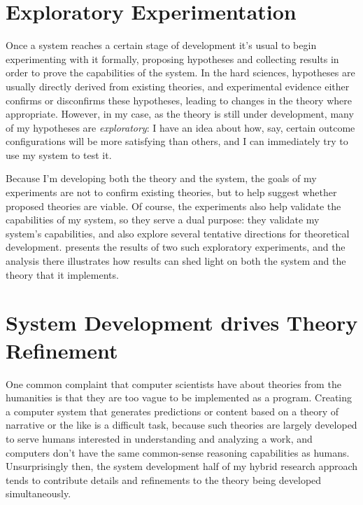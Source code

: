 \section{Exploratory Experimentation}

Once a system reaches a certain stage of development it's usual to begin experimenting with it formally, proposing hypotheses and collecting results in order to prove the capabilities of the system.
%
In the hard sciences, hypotheses are usually directly derived from existing theories, and experimental evidence either confirms or disconfirms these hypotheses, leading to changes in the theory where appropriate.
%
However, in my case, as the theory is still under development, many of my hypotheses are \emph{exploratory}: I have an idea about how, say, certain outcome configurations will be more satisfying than others, and I can immediately try to use my system to test it.


Because I'm developing both the theory and the system, the goals of my experiments are not to confirm existing theories, but to help suggest whether proposed theories are viable.
%
Of course, the experiments also help validate the capabilities of my system, so they serve a dual purpose: they validate my system's capabilities, and also explore several tentative directions for theoretical development.
%
 presents the results of two such exploratory experiments, and the analysis there illustrates how results can shed light on both the system and the theory that it implements.


\section{System Development drives Theory Refinement}


One common complaint that computer scientists have about theories from the humanities is that they are too vague to be implemented as a program.
%
Creating a computer system that generates predictions or content based on a theory of narrative or the like is a difficult task, because such theories are largely developed to serve humans interested in understanding and analyzing a work, and computers don't have the same common-sense reasoning capabilities as humans.
%
Unsurprisingly then, the system development half of my hybrid research approach tends to contribute details and refinements to the theory being developed simultaneously.


